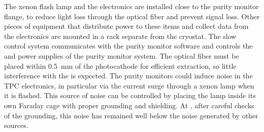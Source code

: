 The xenon flash lamp and the  electronics are installed close to the purity monitor flange, to reduce light loss through the optical fiber and prevent signal loss. Other pieces of equipment that distribute power to these items and collect data from the electronics are mounted in a rack separate from the cryostat. The slow control system communicates with the purity monitor  software and controls  the  and  power supplies of the purity monitor system. The optical fiber must be placed within  \SI{0.5}{\milli\meter} of the photocathode for efficient \phel extraction, so little interference with the  is expected. The purity monitors could induce noise in the TPC electronics, in particular via the current surge through a xenon lamp when it is flashed.  This source of noise can be controlled by placing the lamp inside its own Faraday cage with %
proper grounding and shielding. %
At , after careful checks of the grounding, this noise has remained well below the noise generated by other sources.

